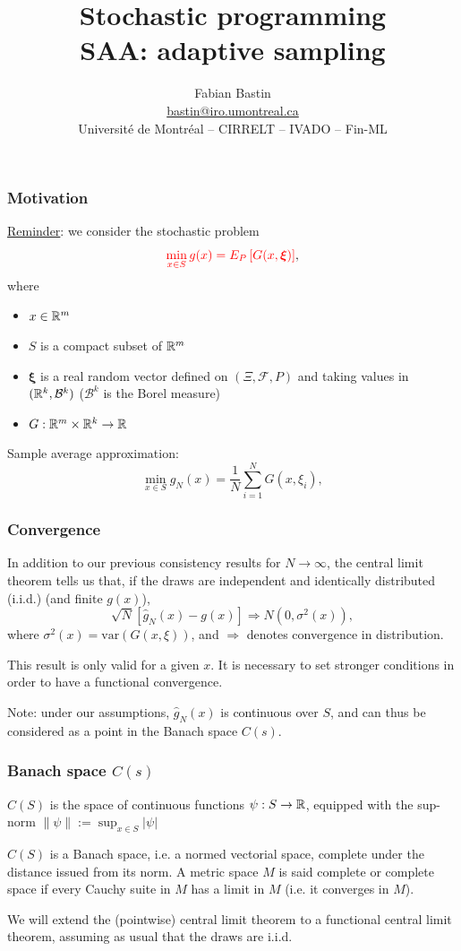 \documentclass{beamer}
\title[Adaptive methods]{Stochastic programming\\SAA: adaptive sampling}
\author[Fabian Bastin]{Fabian Bastin \\ \url{bastin@iro.umontreal.ca} \\ Université de Montréal -- CIRRELT -- IVADO -- Fin-ML}
\date{}
\def\bxi{\boldsymbol\xi}
\begin{document}
\frame{\titlepage}

\begin{frame}
\frametitle{Motivation}

\underline{Reminder}: we consider the stochastic problem
\[
\textcolor{red}{\min_{x \in S} g(x) = E_P \left[ G(x, \bxi) \right]},
\]
where
\begin{itemize}
	\item
	$x \in \mathbb{R}^m$
	\item
	$S$ is a compact subset of $\mathbb{R}^m$
	\item
	$\bxi$ is a real random vector defined on $( \Xi, \mathcal{F}, P )$ and taking values in $( \mathbb{R}^k, \mathcal{B}^k )$ ($\mathcal{B}^k$ is the Borel measure)
	\item
	$G: \mathbb{R}^m \times \mathbb{R}^k \rightarrow \mathbb{R}$
\end{itemize}

Sample average approximation:
\[
\min_{x \in S} \hat{g}_N(x) = \frac{1}{N} \sum_{i = 1}^N G (x, \xi_i),
\]

\end{frame}

\begin{frame}
\frametitle{Convergence}

In addition to our previous consistency results for $N \rightarrow \infty$, the central limit theorem tells us that, if the draws are independent and identically distributed (i.i.d.) (and finite $g(x)$),
\[
\sqrt{N} [ \hat{g}_N(x) - g(x) ] \Rightarrow N(0, \sigma^2(x)),
\]
where $\sigma^2(x) = \mbox{var}(G(x,\xi))$, and $\Rightarrow$ denotes convergence in distribution.

\mbox{}

This result is only valid for a given $x$.
It is necessary to set stronger conditions in order to have a functional convergence.

\mbox{}

Note: under our assumptions, $\hat{g}_N(x)$ is continuous over $S$, and can thus be considered as a point in the Banach space $C(s)$.

\end{frame}

\begin{frame}
\frametitle{Banach space $C(s)$}

$C(S)$ is the space of continuous functions $\psi: S \rightarrow \mathbb{R}$,
equipped with the sup-norm $\| \psi \| := \sup_{x \in S}| \psi |$

\mbox{}

$C(S)$ is a Banach space, i.e. a normed vectorial space, complete under the distance issued from its norm.
A metric space $M$ is said complete or complete space if every Cauchy suite in $M$ has a limit in $M$ (i.e. it converges in $M$).

\mbox{}

We will extend the (pointwise) central limit theorem to a functional central limit theorem, assuming as usual that the draws are i.i.d.

\end{frame}
\end{document}
